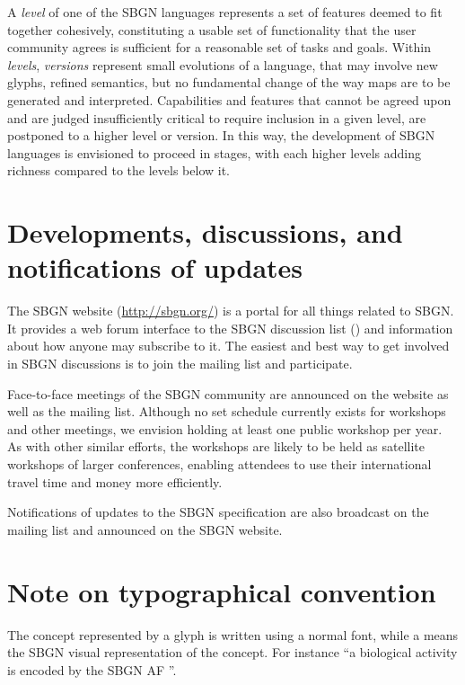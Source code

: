 A \emph{level} of one of the SBGN languages represents a set of features deemed to fit together cohesively, constituting a usable set of functionality that the user community agrees is sufficient for a reasonable set of tasks and goals.  Within \emph{levels}, \emph{versions} represent small evolutions of a language, that may involve new glyphs, refined semantics, but no fundamental change of the way maps are to be generated and interpreted. Capabilities and features that cannot be agreed upon and are judged insufficiently critical to require inclusion in a given level, are postponed to a higher level or version.  In this way, the development of SBGN languages is envisioned to proceed in stages, with each higher levels adding richness compared to the levels below it.

\section{Developments, discussions, and notifications of updates}
\label{sec:discussions}

The SBGN website (\url{http://sbgn.org/}) is a portal for all things related to SBGN.  It provides a web forum interface to the SBGN discussion list () and information about how anyone may subscribe to it.  The easiest and best way to get involved in SBGN discussions is to join the mailing list and participate.

Face-to-face meetings of the SBGN community are announced on the website as well as the mailing list.  Although no set schedule currently exists for workshops and other meetings, we envision holding at least one public workshop per year.  As with other similar efforts, the workshops are likely to be held as satellite workshops of larger conferences, enabling attendees to use their international travel time and money more efficiently.

Notifications of updates to the SBGN specification are also broadcast on the mailing list and announced on the SBGN website.

\section{Note on typographical convention}
The concept represented by a glyph is written using a normal font, while a  means the SBGN visual representation of the concept. For
instance ``a biological activity is encoded by the SBGN AF ''.
